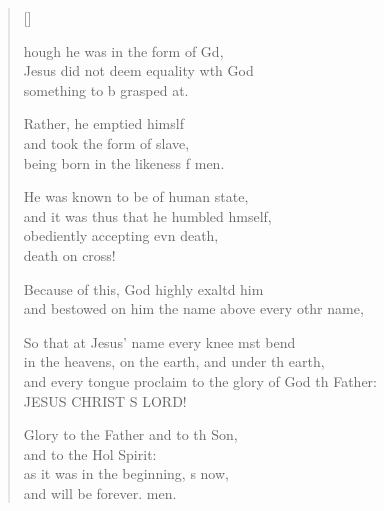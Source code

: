 \settowidth{\versewidth}{and every tongue proclaim to the glory of God the Father: *}
\begin{verse}[\versewidth]
  \begin{patverse}
    hough he was in the form of Gd,\Flex\\
    Jesus did not deem equality w\pointup{\i}th God\Med\\
    something to b grasped at.
    
    Rather, he emptied himslf\Flex\\
    and took the form of  slave,\Med\\
    being born in the likeness f men.
    
    He was known to be of human state,\Med\\
    and it was thus that he humbled h\pointup{\i}mself,\\
    obediently accepting evn death,\Med\\
    death on  cross!
    
    Because of this, God highly exaltd him\Med\\
    and bestowed on him the name above every othr name,
    
    So that at Jesus’ name every knee mst bend\Med\\
    in the heavens, on the earth, and under th earth,\\
    and every tongue proclaim to the glory of God th Father:\Med\\
    JESUS CHRIST S LORD!

    Glory to the Father and to th Son,\Med\\
    and to the Hol Spirit:\\
    as it was in the beginning, \pointup{\i}s now,\Med\\
    and will be forever. men.
  \end{patverse}
\end{verse}
